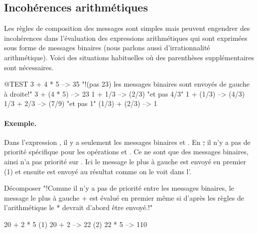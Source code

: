 \documentclass[a4paper,10pt,twoside]{book}
\begin{document}
\subsection{Incoh\'erences arithm\'etiques}
Les r\`egles de composition des messages sont simples mais peuvent
engendrer des incoh\'erences dans l'\'evaluation des expressions
arithm\'etiques qui sont exprim\'ees sous forme de messages binaires
(nous parlons aussi d'irrationnalit\'e arithm\'etique).
Voici des situations habituelles o\`u des parenth\`eses suppl\'ementaires sont n\'ecessaires.

\begin{code}{@TEST}
3 + 4 * 5      --> 35    "!(pas 23)  les messages binaires sont envoy\'es de gauche \`a droite!"
3 + (4 * 5)    --> 23
1 + 1/3         --> (2/3)    "et pas 4/3"
1 + (1/3)       --> (4/3)
1/3 + 2/3       --> (7/9)    "et pas 1"
(1/3) + (2/3)  --> 1
\end{code}

\paragraph{Exemple.} 
Dans l'expression , il y a seulement les messages
binaires \ct{+} et \ct{*}. En \st, il n'y a pas de priorit\'e
sp\'ecifique pour les op\'erations \ct{+} et \ct{*}. Ce ne sont que
des messages binaires, ainsi \ct{*} n'a pas priorit\'e sur \ct{+}. Ici
le message le plus \`a gauche \ct{+} est envoy\'e en premier (1) et
ensuite \ct{*} est envoy\'e au r\'esultat comme on le voit dans l'.  

\begin{example}[binaryMessages1]{D\'ecomposer }{}
"!Comme il n'y a pas de priorit\'e entre les messages binaires, le message le plus \`a gauche + est \'evalu\'e en premier m\^eme si d'apr\`es les r\`egles de l'arithm\'etique le * devrait d'abord \^etre envoy\'e.!"

      20 + 2 * 5 
(1)  20 + 2 --> 22
(2)  22       * 5 --> 110
\end{example}
\end{document}
